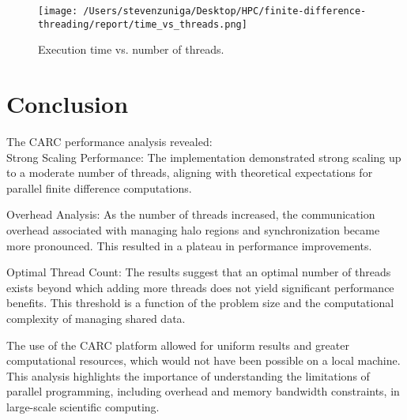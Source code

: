 \documentclass[12pt]{article}
\begin{document}
\begin{figure}[h!]
\centering
\texttt{[image: /Users/stevenzuniga/Desktop/HPC/finite-difference-threading/report/time\_vs\_threads.png]}
\caption{Execution time vs. number of threads.}
\label{fig:time_threads}
\end{figure}

\FloatBarrier

\section{Conclusion}
The CARC performance analysis revealed:\\

Strong Scaling Performance: The implementation demonstrated strong scaling up to a moderate number of threads, aligning with theoretical expectations for parallel finite difference computations.

Overhead Analysis: As the number of threads increased, the communication overhead associated with managing halo regions and synchronization became more pronounced. This resulted in a plateau in performance improvements.

Optimal Thread Count: The results suggest that an optimal number of threads exists beyond which adding more threads does not yield significant performance benefits. This threshold is a function of the problem size and the computational complexity of managing shared data.

The use of the CARC platform allowed for uniform results and greater computational resources, which would not have been possible on a local machine. This analysis highlights the importance of understanding the limitations of parallel programming, including overhead and memory bandwidth constraints, in large-scale scientific computing.
\end{document}
